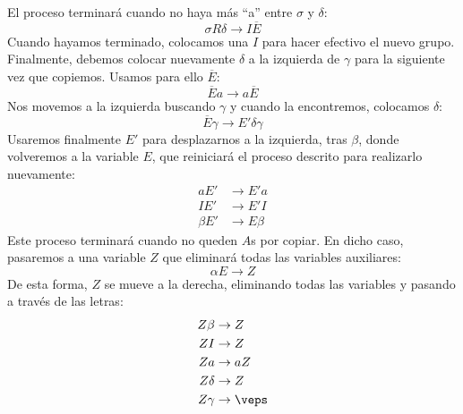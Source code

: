 \begin{ejercicio}
\begin{enumerate}
                El proceso terminará cuando no haya más ``a'' entre $\sigma$ y $\delta$:
                \begin{equation*}
                    \sigma R\delta \rightarrow I\overline{E}
                \end{equation*}
                Cuando hayamos terminado, colocamos una $I$ para hacer efectivo el nuevo grupo. Finalmente, debemos colocar nuevamente $\delta$ a la izquierda de $\gamma$ para la siguiente vez que copiemos. Usamos para ello $\overline{E}$:
                \begin{equation*}
                    \overline{E}a \rightarrow a\overline{E}
                \end{equation*}
                Nos movemos a la izquierda buscando $\gamma$ y cuando la encontremos, colocamos $\delta$:
                \begin{equation*}
                    \overline{E}\gamma \rightarrow E' \delta \gamma
                \end{equation*}
                Usaremos finalmente $E'$ para desplazarnos a la izquierda, tras $\beta$, donde volveremos a la variable $E$, que reiniciará el proceso descrito para realizarlo nuevamente:
                \begin{align*}
                    aE' &\rightarrow E' a \\
                    IE' &\rightarrow E' I \\
                    \beta E' &\rightarrow E\beta
                \end{align*}
                Este proceso terminará cuando no queden $A$s por copiar. En dicho caso, pasaremos a una variable $Z$ que eliminará todas las variables auxiliares:
                \begin{equation*}
                    \alpha E \rightarrow Z
                \end{equation*}
                De esta forma, $Z$ se mueve a la derecha, eliminando todas las variables y pasando a través de las letras:
                \begin{align*}
                    Z\beta &\rightarrow Z \\
                    ZI &\rightarrow Z \\
                    Za &\rightarrow aZ \\
                    Z\delta &\rightarrow Z \\
                    Z\gamma &\rightarrow \veps
                \end{align*}

\end{enumerate}
\end{ejercicio}
